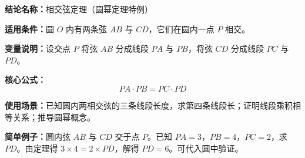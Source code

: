 \textbf{结论名称：}相交弦定理（圆幂定理特例）

\textbf{适用条件：}圆 \(O\) 内有两条弦 \(AB\) 与 \(CD\)，它们在圆内一点 \(P\) 相交。

\textbf{变量说明：}设交点 \(P\) 将弦 \(AB\) 分成线段 \(PA\) 与 \(PB\)，将弦 \(CD\) 分成线段 \(PC\) 与 \(PD\)。

\textbf{核心公式：}
\[
\boxed{PA \cdot PB = PC \cdot PD}
\]

\textbf{使用场景：}已知圆内两相交弦的三条线段长度，求第四条线段长；证明线段乘积相等关系；推导圆幂概念。

\textbf{简单例子：}圆内弦 \(AB\) 与 \(CD\) 交于点 \(P\)。已知 \(PA=3\)，\(PB=4\)，\(PC=2\)，求 \(PD\)。由定理得 \(3 \times 4 = 2 \times PD\)，解得 \(PD=6\)。可代入圆中验证。